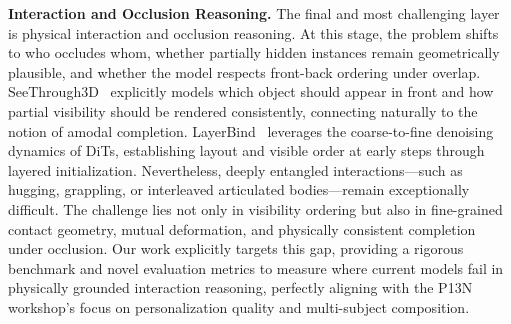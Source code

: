 \textbf{Interaction and Occlusion Reasoning.} 
The final and most challenging layer is physical interaction and occlusion reasoning. At this stage, the problem shifts to who occludes whom, whether partially hidden instances remain geometrically plausible, and whether the model respects front-back ordering under overlap. SeeThrough3D~\cite{seethrough3d2024} explicitly models which object should appear in front and how partial visibility should be rendered consistently, connecting naturally to the notion of amodal completion. LayerBind~\cite{layerbind2024} leverages the coarse-to-fine denoising dynamics of DiTs, establishing layout and visible order at early steps through layered initialization. Nevertheless, deeply entangled interactions—such as hugging, grappling, or interleaved articulated bodies—remain exceptionally difficult. The challenge lies not only in visibility ordering but also in fine-grained contact geometry, mutual deformation, and physically consistent completion under occlusion. Our work explicitly targets this gap, providing a rigorous benchmark and novel evaluation metrics to measure where current models fail in physically grounded interaction reasoning, perfectly aligning with the P13N workshop's focus on personalization quality and multi-subject composition.

